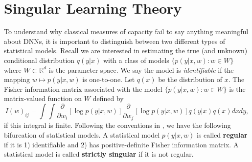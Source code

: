 \documentclass[11pt]{article}
\numberwithin{equation}{section}
\theoremstyle{plain}
\theoremstyle{definition}
\newtheorem{definition}{Definition}
\begin{document}
\section{Singular Learning Theory}
To understand why classical measures of capacity fail to say anything meaningful about DNNs, it is important to distinguish between two different types of statistical models. Recall we are interested in estimating the true (and unknown) conditional distribution $q(y|x)$ with a class of models $\{p(y|x,w): w \in W\}$ where $W \subset \mathbb R^d$ is the parameter space. We say the model is \textit{identifiable} if the mapping $w \mapsto p(y|x,w)$ is one-to-one. Let $q(x)$ be the distribution of $x$. The Fisher information matrix associated with the model $\{p(y|x,w): w \in W \}$ is the matrix-valued function on $W$ defined by
\begin{equation*}
	I(w)_{ij} = \int\!\int \frac{\partial}{\partial w_i}[ \log p(y|x,w) ] \frac{\partial}{\partial w_j}[ \log p(y|x,w) ] q(y|x) q(x) dx dy,
	\label{eq:FIM}
\end{equation*}
if this integral is finite. 
Following the conventions in \citet{watanabe_algebraic_2009}, we have the following bifurcation of statistical models.
A statistical model $p(y|x,w)$ is called \textbf{regular} if it is 1) identifiable and 2) has positive-definite Fisher information matrix. A statistical model is called \textbf{strictly singular} if it is not regular. 
\end{document}
